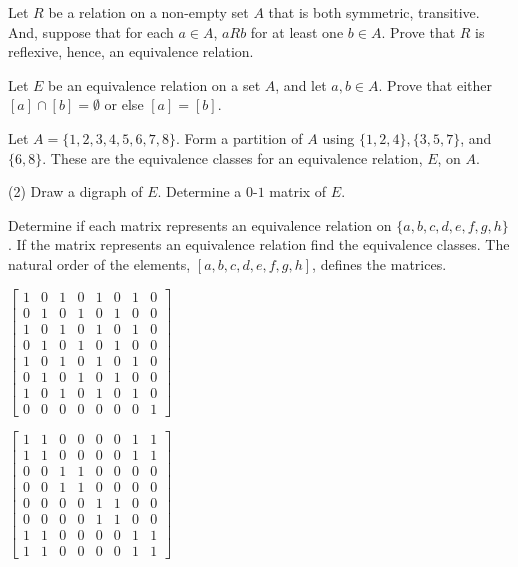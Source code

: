 \begin{exer}
Let $R$ be a relation on a non-empty set $A$ that is both symmetric, transitive. And, suppose that
for each  $a\in A$,  $aRb$ for at least one  $b\in A$. Prove that $R$ is reflexive, hence, an equivalence relation.
\end{exer}

\begin{exer} Let $E$ be an equivalence relation on a set $A$, and let $a, b \in A$. Prove that
either  $[a]\cap [b] = \emptyset$ or else $[a] = [b]$.
\end{exer}


\begin{exer} Let $A=\{1,2,3,4,5,6,7,8\}$. 
Form a partition of $A$ using $\{1,2,4\}, \{3,5,7\}$, and $\{6,8\}$.
These are the equivalence classes for an equivalence relation, $E$, on $A$.
\begin{tasks}(2)
     \task Draw a digraph of $E$.
     \task Determine a $0$-$1$ matrix of $E$. 
\end{tasks}
\end{exer}

\begin{exer} Determine if each matrix represents an equivalence relation on $\{a,b,c,d,e,f,g,h\}$.
If the matrix represents an equivalence relation find the equivalence classes.  The natural order
of the elements,  $[a,b,c,d,e,f,g,h]$, defines the matrices.

\vspace*{0.25cm}
\begin{enumerate*}[label=(\alph*), itemjoin=\qquad]
\item 
 $\left[
\begin{matrix}
 1&0&1&0&1&0&1&0\\ 
 0&1&0&1&0&1&0&0\\ 
 1&0&1&0&1&0&1&0\\
 0&1&0&1&0&1&0&0\\ 
 1&0&1&0&1&0&1&0\\ 
 0&1&0&1&0&1&0&0\\ 
 1&0&1&0&1&0&1&0\\
 0&0&0&0&0&0&0&1
\end{matrix}
\right]$ 

\item 
$\left[
\begin{matrix}
 1&1&0&0&0&0&1&1\\
 1&1&0&0&0&0&1&1\\ 
 0&0&1&1&0&0&0&0\\ 
 0&0&1&1&0&0&0&0\\
 0&0&0&0&1&1&0&0\\ 
 0&0&0&0&1&1&0&0\\ 
 1&1&0&0&0&0&1&1\\
 1&1&0&0&0&0&1&1 
\end{matrix}
\right]$
\end{enumerate*}
\end{exer}

